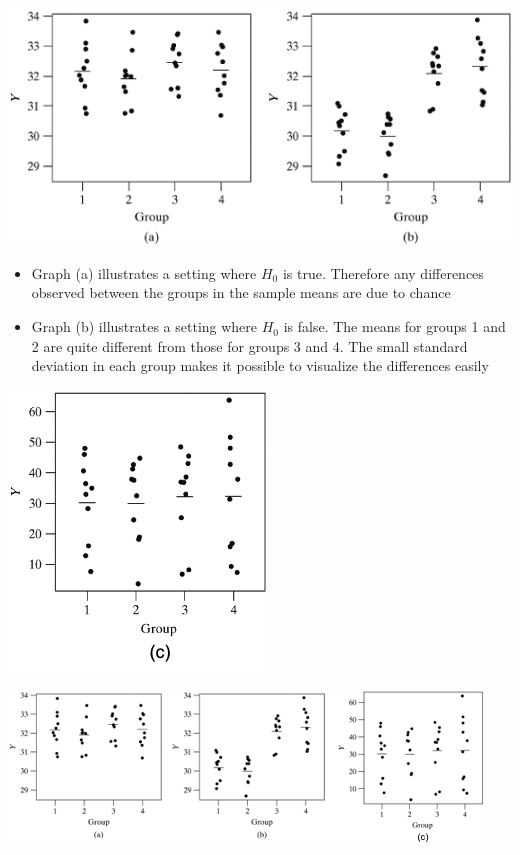 \documentclass[
]{book}
\providecommand{\tightlist}{%
  \setlength{\itemsep}{0pt}\setlength{\parskip}{0pt}}
\begin{document}
\includegraphics[width=1\linewidth]{./10_10}

\begin{itemize}
\tightlist
\item
  Graph (a) illustrates a setting where \(H_0\) is true. Therefore any differences observed between the groups in the sample means are due to chance
\item
  Graph (b) illustrates a setting where \(H_0\) is false. The means for groups 1 and 2 are quite different from those for groups 3 and 4. The small standard deviation in each group makes it possible to visualize the differences easily
\end{itemize}

\includegraphics[width=0.5\linewidth]{./10_12}

\includegraphics[width=1\linewidth]{./10_13}
\end{document}
